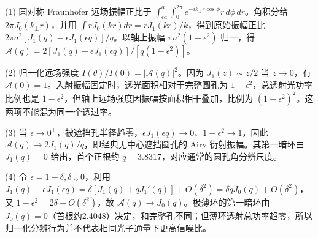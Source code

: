 (1) 圆对称 Fraunhofer 远场振幅正比于 \(\int_{\epsilon a}^{a}\int_0^{2\pi}e^{-ik_\perp r\cos\phi}r\,d\phi\,dr\)。角积分给 \(2\pi J_0(k_\perp r)\)，并用 \(\int rJ_0(kr)dr=rJ_1(kr)/k\)，得到原始振幅正比 \(2\pi a^2[J_1(q)-\epsilon J_1(\epsilon q)]/q\)。以轴上振幅 \(\pi a^2(1-\epsilon^2)\) 归一，得 \(\mathcal A(q)=2[J_1(q)-\epsilon J_1(\epsilon q)]/[q(1-\epsilon^2)]\)。

(2) 归一化远场强度 \(I(\theta)/I(0)=|\mathcal A(q)|^2\)。因为 \(J_1(z)\sim z/2\) 当 \(z\to0\)，有 \(\mathcal A(0)=1\)。入射振幅固定时，透光面积相对于完整圆孔为 \(1-\epsilon^2\)，总透射光功率比例也是 \(1-\epsilon^2\)，但轴上远场强度因振幅按面积相干叠加，比例为 \((1-\epsilon^2)^2\)。这两项不能混为同一个透过率。

(3) 当 \(\epsilon\to0^+\)，被遮挡孔半径趋零，\(\epsilon J_1(\epsilon q)\to0\)、\(1-\epsilon^2\to1\)，因此 \(\mathcal A(q)\to 2J_1(q)/q\)，即经典无中心遮挡圆孔的 Airy 衍射振幅。其第一暗环由 \(J_1(q)=0\) 给出，首个正根约 \(q=3.8317\)，对应通常的圆孔角分辨尺度。

(4) 令 \(\epsilon=1-\delta,\delta\downarrow0\)，利用 \(J_1(q)-\epsilon J_1(\epsilon q)=\delta[J_1(q)+qJ_1'(q)]+O(\delta^2)=\delta qJ_0(q)+O(\delta^2)\)，又 \(1-\epsilon^2=2\delta+O(\delta^2)\)，故 \(\mathcal A(q)\to J_0(q)\)。极薄环的第一暗环由 \(J_0(q)=0\)（首根约2.4048）决定，和完整孔不同；但薄环透射总功率趋零，所以归一化分辨行为并不代表相同光子通量下更高信噪比。
